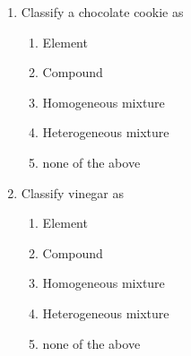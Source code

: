 \documentclass[main.tex]{subfiles}
\begin{document}
\begin{multicols*}{2}
\begin{enumerate}
\item Classify a chocolate cookie as
\begin{enumerate}[label=(\alph*)]
\item Element
\item Compound
\item Homogeneous mixture
\item Heterogeneous mixture
\item none of the above
\end{enumerate}

\item Classify vinegar as
\begin{enumerate}[label=(\alph*)]
\item Element
\item Compound
\item Homogeneous mixture
\item Heterogeneous mixture
\item none of the above
\end{enumerate}



\end{enumerate}
\end{multicols*}
\end{document}
